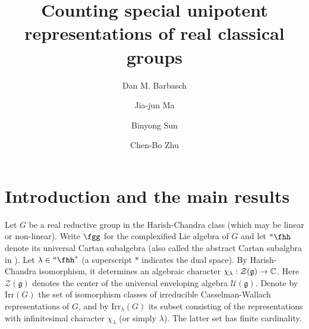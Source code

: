 \documentclass[12pt,a4paper]{amsart}
\newcommand{\CZ}{{\mathcal {Z}}}
\newcommand{\g}{\mathfrak g}
\numberwithin{equation}{section}
\theoremstyle{remark}
\def\Irr{\mathrm{Irr}}
\def\hha{{}^a\fhh}
\begin{document}
\title[]{Counting special unipotent representations of real classical groups}

\author [D. Barbasch] {Dan M. Barbasch}
\address{the Department of Mathematics\\
  310 Malott Hall, Cornell University, Ithaca, New York 14853 }

\author [J.-J. Ma] {Jia-jun Ma}
\address{School of Mathematical Sciences\\
  Xiamen University\\
  Xiamen, China} 

\author [B. Sun] {Binyong Sun}
\address{Academy of Mathematics and Systems Science\\
  Chinese Academy of Sciences\\
  Beijing, 100190, China} 

\author [C.-B. Zhu] {Chen-Bo Zhu}
\address{Department of Mathematics\\
  National University of Singapore\\
  10 Lower Kent Ridge Road, Singapore 119076} 




 

\maketitle


\tableofcontents



\section{Introduction and the main results}

Let $G$ be a real reductive group in the Harish-Chandra class (which may be
linear or non-linear). Write $\fgg$ for the complexified Lie algebra of $G$ and
let $\hha$ denote its universal Cartan subalgebra (also called the abstract Cartan subalgbra in \cite{V4}).
Let $\lambda \in \hha^*$ (a superscript $*$ indicates the dual space). By Harish-Chandra isomorphism, it
determines an algebraic character $\chi_\lambda: \CZ(\g)\rightarrow \C$. Here
$\CZ(\g)$ denotes the center of the universal enveloping algebra
$\mathcal U(\g)$. Denote by $\Irr(G)$ the set of isomorphism classes of
irreducible Casselman-Wallach representations of $G$, and by $\Irr_\lambda(G)$
its subset consisting of the representations with infinitesimal character
$\chi_\lambda$ (or simply $\lambda$). The latter set has finite cardinality.
\end{document}
